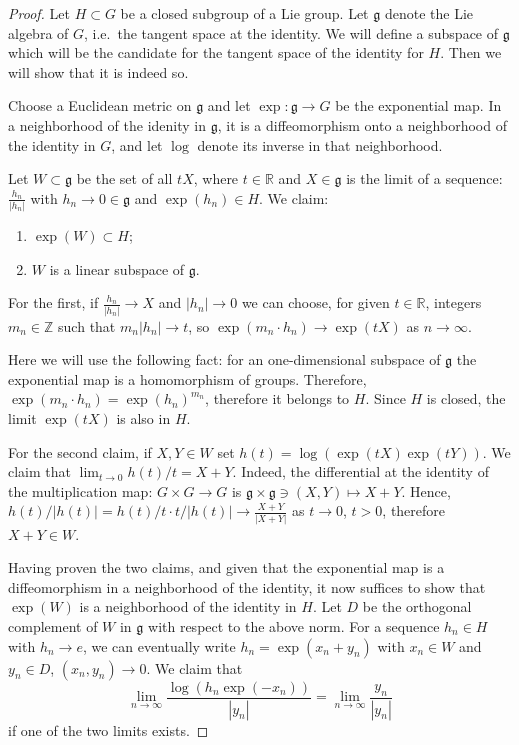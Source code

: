 \begin{proof}
Let $H\subset G$ be a closed subgroup of a Lie group. Let $\mathfrak g$ denote the Lie algebra of $G$, i.e.\ the tangent space at the identity. We will define a subspace of $\mathfrak g$ which will be the candidate for the tangent space of the identity for $H$. Then we will show that it is indeed so.

Choose a Euclidean metric on $\mathfrak g$ and let $\exp:\mathfrak g \to G$ be the exponential map. In a neighborhood of the idenity in $\mathfrak g$, it is a diffeomorphism onto a neighborhood of the identity in $G$, and let $\log$ denote its inverse in that neighborhood.

Let $W\subset \mathfrak g$ be the set of all $tX$, where $t\in \mathbb R$ and $X \in \mathfrak g$ is the limit of a sequence: $\frac{h_n}{|h_n|}$ with $h_n\to 0\in \mathfrak g$ and $\exp(h_n)\in H$. We claim:

\begin{enumerate}
 \item $\exp(W)\subset H$;
 \item $W$ is a linear subspace of $\mathfrak g$.
\end{enumerate}

For the first, if $\frac{h_n}{|h_n|} \to X$ and $|h_n|\to 0$ we can choose, for given $t\in \mathbb R$, integers $m_n\in \mathbb Z$ such that $m_n|h_n|\to t$, so $\exp(m_n\cdot h_n) \to \exp(tX)$ as $n\to \infty$. 

Here we will use the following fact: for an one-dimensional subspace of $\mathfrak g$ the exponential map is a homomorphism of groups. Therefore, $\exp(m_n\cdot h_n) = \exp(h_n)^{m_n}$, therefore it belongs to $H$. Since $H$ is closed, the limit $\exp(tX)$ is also in $H$.

For the second claim, if $X,Y\in W$ set $h(t)= \log(\exp(tX)\exp(tY))$. We claim that $\lim_{t\to 0} h(t)/t = X+Y$. Indeed, the differential at the identity of the multiplication map: $G\times G\to G$ is $\mathfrak g\times\mathfrak g\ni (X,Y)\mapsto X+Y$. Hence, $h(t)/|h(t)| = h(t)/t \cdot t/|h(t)| \to \frac{X+Y}{|X+Y|}$ as $t\to 0$, $t>0$, therefore $X+Y\in W$. 

Having proven the two claims, and given that the exponential map is a diffeomorphism in a neighborhood of the identity, it now suffices to show that $\exp(W)$ is a neighborhood of the identity in $H$. Let $D$ be the orthogonal complement of $W$ in $\mathfrak g$ with respect to the above norm. For a sequence $h_n\in H$ with $h_n\to e$, we can eventually write $h_n = \exp(x_n+y_n)$ with $x_n\in W$ and $y_n\in D$, $(x_n,y_n)\to 0$. We claim that
$$\lim_{n\to \infty} \frac{\log(h_n \exp(-x_n))}{|y_n|} = \lim_{n\to \infty}\frac{y_n}{|y_n|}$$
if one of the two limits exists. 


\end{proof}
